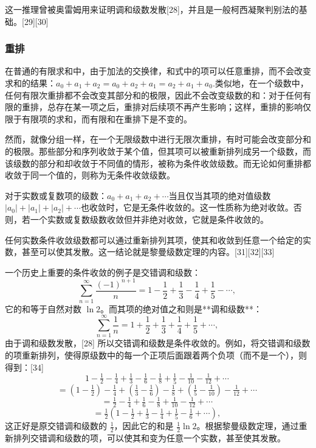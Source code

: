 这一推理曾被奥雷姆用来证明调和级数发散[28]，并且是一般柯西凝聚判别法的基础。[29][30]
\subsubsection{重排}
在普通的有限求和中，由于加法的交换律，和式中的项可以任意重排，而不会改变求和的结果：$a_{0} + a_{1} + a_{2} = a_{0} + a_{2} + a_{1} = a_{2} + a_{1} + a_{0}$.类似地，在一个级数中，任何有限次重排都不会改变其部分和的极限，因此不会改变级数的和：对于任何有限的重排，总存在某一项之后，重排对后续项不再产生影响；这样，重排的影响仅限于有限项的求和，而有限和在重排下是不变的。

然而，就像分组一样，在一个无限级数中进行无限次重排，有时可能会改变部分和的极限。那些部分和序列收敛于某个值，但其项可以被重新排列成另一个级数，而该级数的部分和却收敛于不同值的情形，被称为条件收敛级数。而无论如何重排都收敛于同一个值的，则称为无条件收敛级数。

对于实数或复数项的级数：$a_{0} + a_{1} + a_{2} + \cdots$当且仅当其项的绝对值级数$|a_{0}| + |a_{1}| + |a_{2}| + \cdots$也收敛时，它是无条件收敛的。这一性质称为绝对收敛。否则，若一个实数或复数级数收敛但并非绝对收敛，它就是条件收敛的。

任何实数条件收敛级数都可以通过重新排列其项，使其和收敛到任意一个给定的实数，甚至可以使其发散。这一结论就是黎曼级数定理的内容。[31][32][33]

一个历史上重要的条件收敛的例子是交错调和级数：
$$
\sum_{n=1}^{\infty} \frac{(-1)^{n+1}}{n} 
= 1 - \frac{1}{2} + \frac{1}{3} - \frac{1}{4} + \frac{1}{5} - \cdots ,~
$$
它的和等于自然对数 $\ln 2$。而其项的绝对值之和则是**调和级数**：
$$
\sum_{n=1}^{\infty} \frac{1}{n} 
= 1 + \frac{1}{2} + \frac{1}{3} + \frac{1}{4} + \frac{1}{5} + \cdots ,~
$$
由于调和级数发散，[28] 所以交错调和级数是条件收敛的。例如，将交错调和级数的项重新排列，使得原级数中的每一个正项后面跟着两个负项（而不是一个），则得到：[34]
$$
1 - \tfrac{1}{2} - \tfrac{1}{4} + \tfrac{1}{3} - \tfrac{1}{6} - \tfrac{1}{8} + \tfrac{1}{5} - \tfrac{1}{10} - \tfrac{1}{12} + \cdots~
$$
$$
= \left(1 - \tfrac{1}{2}\right) - \tfrac{1}{4} + \left(\tfrac{1}{3} - \tfrac{1}{6}\right) - \tfrac{1}{8} + \left(\tfrac{1}{5} - \tfrac{1}{10}\right) - \tfrac{1}{12} + \cdots~
$$
$$
= \tfrac{1}{2} - \tfrac{1}{4} + \tfrac{1}{6} - \tfrac{1}{8} + \tfrac{1}{10} - \tfrac{1}{12} + \cdots~
$$
$$
= \tfrac{1}{2}\left(1 - \tfrac{1}{2} + \tfrac{1}{3} - \tfrac{1}{4} + \tfrac{1}{5} - \tfrac{1}{6} + \cdots\right),~
$$
这正好是原交错调和级数的 $\tfrac{1}{2}$，因此它的和是 $\tfrac{1}{2}\ln 2$。根据黎曼级数定理，通过重新排列交错调和级数的项，可以使其和变为任意一个实数，甚至使其发散。
